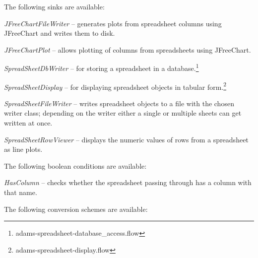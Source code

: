 \documentclass[a4paper]{book}
\begin{document}
The following sinks are available:
\begin{tight_itemize}
	\item \textit{JFreeChartFileWriter} -- generates plots from spreadsheet
	columns using JFreeChart\cite{jfreechart} and writes them to disk.
	\item \textit{JFreeChartPlot} -- allows plotting of columns from
	spreadsheets using JFreeChart\cite{jfreechart}.
	\item \textit{SpreadSheetDbWriter} -- for storing a spreadsheet in a
	database.\footnote{adams-spreadsheet-database\_access.flow}
	\item \textit{SpreadSheetDisplay} -- for displaying spreadsheet objects
	in tabular form.\footnote{adams-spreadsheet-display.flow}
	\item \textit{SpreadSheetFileWriter} -- writes spreadsheet objects to a file
	with the chosen writer class; depending on the writer either a single or
	multiple sheets can get written at once.
	\item \textit{SpreadSheetRowViewer} -- displays the numeric values of
	rows from a spreadsheet as line plots.
\end{tight_itemize}
The following boolean conditions are available:
\begin{tight_itemize}
	\item \textit{HasColumn} -- checks whether the spreadsheet passing through
	has a column with that name.
\end{tight_itemize}
The following conversion schemes are available:
\end{document}
